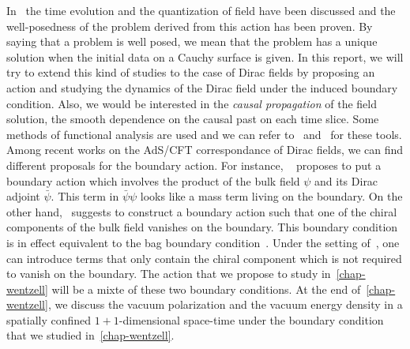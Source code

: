 In~\cite{Zahn2016} the time evolution and the quantization of field have been discussed and the well-posedness of the problem derived from this action has been proven.
By saying that a problem is well posed, we mean that the problem has a unique solution when the initial data on a Cauchy surface is given.
In this report, we will try to extend this kind of studies to the case of Dirac fields by proposing an action and studying the dynamics of the Dirac field under the induced boundary condition.
Also, we would be interested in the \textit{causal propagation} of the field solution, \ie the smooth dependence on the causal past on each time slice.
Some methods of functional analysis are used and we can refer to~\cite{Reed1981} and~\cite{Reed1975} for these tools. 
%
Among recent works on the AdS/CFT correspondance of Dirac fields, we can find different proposals for the boundary action.
For instance, 
~\cite{Henningson1998} proposes to put a boundary action which involves the product of the bulk field $\psi$ and its Dirac adjoint $\bar{\psi}$. 
This term in $\bar{\psi}\psi$ looks like a mass term living on the boundary.
On the other hand,~\cite{Contino2005} suggests to construct a boundary action such that one of the chiral components of the bulk field vanishes on the boundary.
This boundary condition is in effect equivalent to the bag boundary condition~\cite{Chodos1974}.
Under the setting of~\cite{Contino2005}, one can introduce terms that only contain the chiral component which is not required to vanish on the boundary.
The action that we propose to study in~\cref{chap-wentzell} will be a mixte of these two boundary conditions.
At the end of~\cref{chap-wentzell}, we discuss the vacuum polarization and the vacuum energy density in a spatially confined $1+1$-dimensional space-time under the boundary condition that we studied in~\cref{chap-wentzell}.

